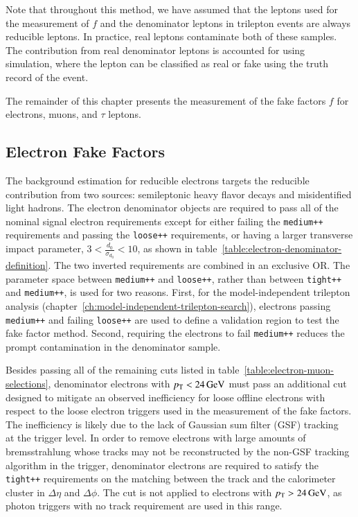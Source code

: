 Note that throughout this method, we have assumed that the leptons used for the measurement of $f$ and the denominator leptons in trilepton events are always reducible leptons. In practice, real leptons contaminate both of these samples. The contribution from real denominator leptons is accounted for using simulation, where the lepton can be classified as real or fake using the truth record of the event.

The remainder of this chapter presents the measurement of the fake factors $f$ for electrons, muons, and $\tau$ leptons. 

\subsection{Electron Fake Factors}\label{sec:electron-fake-factors}
The background estimation for reducible electrons targets the reducible contribution from two sources: semileptonic heavy flavor decays and misidentified light hadrons. The electron denominator objects are required to pass all of the nominal signal electron requirements except for either failing the \texttt{medium++} requirements and passing the \texttt{loose++} requirements, or having a larger transverse impact parameter, $3<\frac{d_0}{\sigma_{d_0}}<10$, as shown in table~\ref{table:electron-denominator-definition}. The two inverted requirements are combined in an exclusive OR. The parameter space between \texttt{medium++} and \texttt{loose++}, rather than between \texttt{tight++} and \texttt{medium++}, is used for two reasons. First, for the model-independent trilepton analysis (chapter~\ref{ch:model-independent-trilepton-search}), electrons passing \texttt{medium++} and failing \texttt{loose++} are used to define a validation region to test the fake factor method. Second, requiring the electrons to fail \texttt{medium++} reduces the prompt contamination in the denominator sample.

Besides passing all of the remaining cuts listed in table~\ref{table:electron-muon-selections}, denominator electrons with $p_{\text{T}}<\SI{24}{\giga\electronvolt}$ must pass an additional cut designed to mitigate an observed inefficiency for loose offline electrons with respect to the loose electron triggers used in the measurement of the fake factors. The inefficiency is likely due to the lack of Gaussian sum filter (GSF) tracking~\cite{TheATLASCollaboration:2012vr} at the trigger level. In order to remove electrons with large amounts of bremsstrahlung whose tracks may not be reconstructed by the non-GSF tracking algorithm in the trigger, denominator electrons are required to satisfy the \texttt{tight++} requirements on the matching between the track and the calorimeter cluster in $\Delta \eta$ and $\Delta \phi$. The cut is not applied to electrons with $p_{\text{T}}>\SI{24}{\giga\electronvolt}$, as photon triggers with no track requirement are used in this range. 


